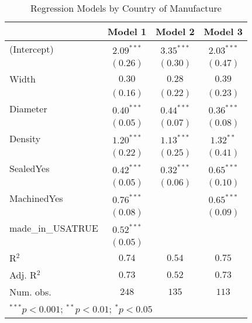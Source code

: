 
\begin{table}
\begin{center}
\begin{tabular}{l c c c}
\hline
 & Model 1 & Model 2 & Model 3 \\
\hline
(Intercept)       & $2.09^{***}$ & $3.35^{***}$ & $2.03^{***}$ \\
                  & $(0.26)$     & $(0.30)$     & $(0.47)$     \\
Width             & $0.30$       & $0.28$       & $0.39$       \\
                  & $(0.16)$     & $(0.22)$     & $(0.23)$     \\
Diameter          & $0.40^{***}$ & $0.44^{***}$ & $0.36^{***}$ \\
                  & $(0.05)$     & $(0.07)$     & $(0.08)$     \\
Density           & $1.20^{***}$ & $1.13^{***}$ & $1.32^{**}$  \\
                  & $(0.22)$     & $(0.25)$     & $(0.41)$     \\
SealedYes         & $0.42^{***}$ & $0.32^{***}$ & $0.65^{***}$ \\
                  & $(0.05)$     & $(0.06)$     & $(0.10)$     \\
MachinedYes       & $0.76^{***}$ &              & $0.65^{***}$ \\
                  & $(0.08)$     &              & $(0.09)$     \\
made\_in\_USATRUE & $0.52^{***}$ &              &              \\
                  & $(0.05)$     &              &              \\
\hline
R$^2$             & $0.74$       & $0.54$       & $0.75$       \\
Adj. R$^2$        & $0.73$       & $0.52$       & $0.73$       \\
Num. obs.         & $248$        & $135$        & $113$        \\
\hline
\multicolumn{4}{l}{\scriptsize{$^{***}p<0.001$; $^{**}p<0.01$; $^{*}p<0.05$}}
\end{tabular}
\caption{Regression Models by Country of Manufacture}
\label{tab:reg_by_country}
\end{center}
\end{table}
